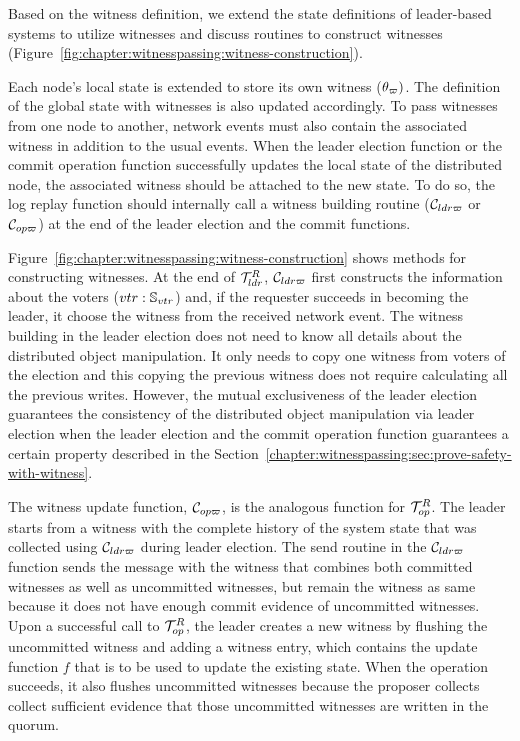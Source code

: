 Based on the witness definition, we extend the state definitions of
leader-based systems to utilize witnesses and discuss routines to construct
witnesses (Figure~\ref{fig:chapter:witnesspassing:witness-construction}).

Each node's local state is extended to store its own witness ($\theta_\varpi)$.
The definition of the global state with witnesses is also updated accordingly.
To pass witnesses from one node to another,
network events must also contain the associated witness in addition to the usual events.
When the leader election function or the commit operation function successfully updates the local state of the distributed node, the associated witness should be
attached to the new state. To do so, the log replay function should internally call a witness building routine ($\mathcal{C}_{ldr\varpi}$ or $\mathcal{C}_{op\varpi}$) at the end of the
leader election and the commit functions.

Figure~\ref{fig:chapter:witnesspassing:witness-construction} shows methods for constructing witnesses.
At the end of $\mathcal{T}^{R}_{ldr}$, $\mathcal{C}_{ldr\varpi}$ first constructs the information about the
voters ($vtr:\mathbb{S}_{vtr}$) and, if the requester succeeds in becoming the leader,
it choose the witness from the received network event. 
The witness building in the leader election does not need to know 
all details about the distributed object manipulation.
It only needs to copy one witness from voters of the election and this copying the previous witness does not require calculating all the previous writes. 
However, the mutual exclusiveness of the leader election guarantees the consistency of the distributed object manipulation via leader election when the leader election and the commit operation function guarantees a 
 certain property described in the Section~\ref{chapter:witnesspassing:sec:prove-safety-with-witness}. 
 
The witness update function, $\mathcal{C}_{op\varpi}$, is the analogous function for $\mathcal{T}^{R}_{op}$.
The leader starts from a witness with the complete history of the system state
that was collected using $\mathcal{C}_{ldr\varpi}$ during leader election.
The send routine in the $\mathcal{C}_{ldr\varpi}$ function sends the message with the witness that combines both committed witnesses as well as uncommitted witnesses, but remain the witness as same because it does not have enough commit evidence of uncommitted witnesses. 
Upon a successful call to $\mathcal{T}^{R}_{op}$, the leader creates a new witness by flushing the uncommitted witness and 
adding a witness entry, which contains the update function $f$ that is to be used
to update the existing state.
When the operation succeeds, it also flushes uncommitted witnesses because the proposer collects collect sufficient evidence that those uncommitted witnesses are written in the quorum.  

